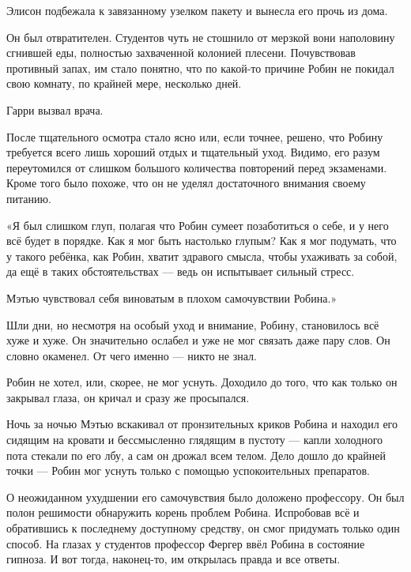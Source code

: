 \documentclass[a4paper,12pt]{book}
\begin{document}
\par
Элисон подбежала к завязанному узелком пакету и вынесла его прочь из дома.
\par
Он был отвратителен. Студентов чуть не стошнило от мерзкой вони наполовину сгнившей еды, полностью захваченной колонией плесени. Почувствовав противный запах, им стало понятно, что по какой-то причине Робин не покидал свою комнату, по крайней мере, несколько дней.
\par
Гарри вызвал врача.\\ 
\par
После тщательного осмотра стало ясно или, если точнее, решено, что Робину требуется всего лишь хороший отдых и тщательный уход. Видимо, его разум переутомился от слишком большого количества повторений перед экзаменами. Кроме того было похоже,  что он не уделял достаточного внимания своему питанию.\\
\par
«Я был слишком глуп, полагая что Робин сумеет позаботиться о себе, и у него всё будет в порядке. Как я мог быть настолько глупым? Как я мог подумать, что у такого ребёнка, как Робин, хватит здравого смысла, чтобы ухаживать за собой, да ещё в таких обстоятельствах — ведь он испытывает сильный стресс.
\par
Мэтью чувствовал себя виноватым в плохом самочувствии Робина.»\\
\par
Шли дни, но несмотря на особый уход и внимание, Робину, становилось всё хуже и хуже. Он значительно ослабел и уже не мог связать даже пару слов. Он словно окаменел. От чего именно — никто не знал.
\par
Робин не хотел, или, скорее, не мог уснуть. Доходило до того, что как только он закрывал глаза, он кричал и сразу же просыпался.
\par
Ночь за ночью Мэтью вскакивал от пронзительных криков Робина и находил его сидящим на кровати и бессмысленно глядящим в пустоту — капли холодного пота стекали по его лбу, а сам он дрожал всем телом. Дело дошло до крайней точки — Робин мог уснуть только с помощью успокоительных препаратов.\\
\par
О неожиданном ухудшении его самочувствия было доложено профессору. Он был полон решимости обнаружить корень проблем Робина. Испробовав всё и обратившись к последнему доступному средству, он смог придумать только один способ. На глазах у студентов профессор Фергер ввёл Робина в состояние гипноза. И вот тогда, наконец-то, им открылась правда и все ответы.
\end{document}

